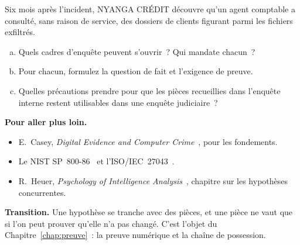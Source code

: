 \begin{boxexo}[title={\ding{45}\quad Exercice~1.4. Trois cadres pour une affaire \niveauexpert}]
Six mois après l'incident, NYANGA CRÉDIT découvre qu'un agent comptable a
consulté, sans raison de service, des dossiers de clients figurant parmi les
fichiers exfiltrés.
\begin{enumerate}[(a)]
    \item Quels cadres d'enquête peuvent s'ouvrir~? Qui mandate chacun~?
    \item Pour chacun, formulez la question de fait et l'exigence de preuve.
    \item Quelles précautions prendre pour que les pièces recueillies dans
          l'enquête interne restent utilisables dans une enquête judiciaire~?
\end{enumerate}
\end{boxexo}

\bigskip

\begin{boxinfo}
\textbf{Pour aller plus loin.}
\begin{itemize}
    \item E.~Casey, \textit{Digital Evidence and Computer
          Crime}~\cite{casey2004}, pour les fondements.
    \item Le NIST SP~800-86~\cite{nist80086} et l'ISO/IEC~27043~\cite{iso27043_2015}.
    \item R.~Heuer, \textit{Psychology of Intelligence
          Analysis}~\cite{heuer1999}, chapitre sur les hypothèses
          concurrentes.
\end{itemize}
\end{boxinfo}

\begin{boxinfo}
\textbf{Transition.} Une hypothèse se tranche avec des pièces, et une pièce
ne vaut que si l'on peut prouver qu'elle n'a pas changé. C'est l'objet du
Chapitre~\ref{chap:preuve}~: la preuve numérique et la chaîne de possession.
\end{boxinfo}
